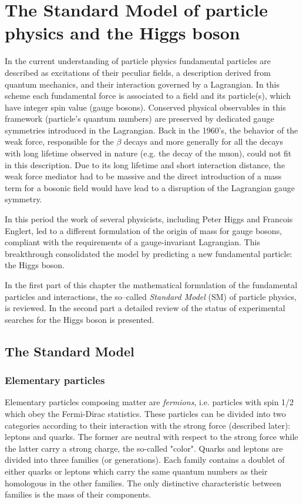 \chapter[The Higgs boson]{The Standard Model of particle physics and the Higgs boson}

In the current understanding of particle physics fundamental particles are described as excitations of their peculiar fields, a description derived from quantum mechanics, and their interaction governed by a Lagrangian. In this scheme each fundamental force is associated to a field and its particle(s), which have integer spin value (gauge bosons). Conserved physical observables in this framework (particle's quantum numbers) are preserved by dedicated gauge symmetries introduced in the Lagrangian. Back in the 1960's, the behavior of the weak force, responsible for the $\beta$ decays and more generally for all the decays with long lifetime observed in nature (e.g. the decay of the muon), could not fit in this description. Due to its long lifetime and short interaction distance, the weak force mediator had to be massive and the direct introduction of a mass term for a bosonic field would have lead to a disruption of the Lagrangian gauge symmetry. 

In this period the work of several physicists, including Peter Higgs and Francois Englert, led to a different formulation of the origin of mass for gauge bosons, compliant with the requirements of a gauge-invariant Lagrangian. This breakthrough consolidated the model by predicting a new fundamental particle: the Higgs boson.

In the first part of this chapter the mathematical formulation of the fundamental particles and interactions, the so--called \emph{Standard Model} (SM) of particle physics, is reviewed. In the second part a detailed review of the status of experimental searches for the Higgs boson is presented.

\section{The Standard Model}
\subsection{Elementary particles}

Elementary particles composing matter are \emph{fermions}, i.e. particles with spin 1/2 which obey the Fermi-Dirac statistics. These particles can be divided into two categories according to their interaction with the strong force (described later): leptons and quarks. The former are neutral with respect to the strong force while the latter carry a strong charge, the so-called "color". Quarks and leptons are divided into three families (or generations). Each family contains a doublet of either quarks or leptons which carry the same quantum numbers as their homologous in the other families. The only distinctive characteristic between families is the mass of their components.

